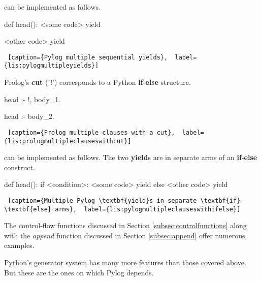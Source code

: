 can be implemented as follows.

\begin{minipage}{\linewidth}  \largev  \hrulefill  
\begin{python}
def head():
    <some code>
    yield
    
    <other code>
    yield
\end{python}
\begin{lstlisting} [caption={Pylog multiple sequential yields},  label={lis:pylogmultipleyields}]
\end{lstlisting}
\end{minipage}

Prolog's \textbf{cut} ('!') corresponds to a Python \textbf{if}-\textbf{else} structure.

\begin{minipage}{\linewidth}  \largev  \hrulefill  
\begin{python}
head :- !, body_1.

head :- body_2.
\end{python}
\begin{lstlisting} [caption={Prolog multiple clauses with a cut},  label={lis:prologmultipleclauseswithcut}]
\end{lstlisting}
\end{minipage}

can be implemented as follows. The two \textbf{yield}s are in separate arms of an \textbf{if}-\textbf{else} construct.

\begin{minipage}{\linewidth}  \largev  \hrulefill  
\begin{python}
def head():
    if <condition>:
      <some code>
      yield
    else
      <other code>
      yield
\end{python}
\begin{lstlisting} [caption={Multiple Pylog \textbf{yield}s in separate \textbf{if}-\textbf{else} arms},  label={lis:pylogmultipleclauseswithifelse}]
\end{lstlisting}
\end{minipage}

The control-flow functions discussed in Section \ref{subsec:controlfunctions} along with the \textit{append} function discussed in Section \ref{subsec:append} offer numerous examples.

\largev
Python's generator system has many more features than those covered above. But these are the ones on which Pylog depends. 


